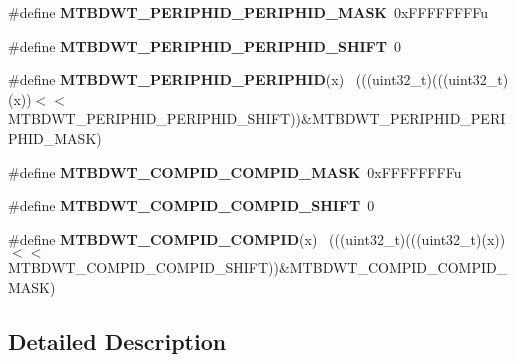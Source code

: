 \begin{DoxyCompactItemize}
\item 
\hypertarget{group___m_t_b_d_w_t___register___masks_gaa49f29267dcedd6db6aafce7b226182b}{}\#define {\bfseries M\+T\+B\+D\+W\+T\+\_\+\+P\+E\+R\+I\+P\+H\+I\+D\+\_\+\+P\+E\+R\+I\+P\+H\+I\+D\+\_\+\+M\+A\+S\+K}~0x\+F\+F\+F\+F\+F\+F\+F\+Fu\label{group___m_t_b_d_w_t___register___masks_gaa49f29267dcedd6db6aafce7b226182b}

\item 
\hypertarget{group___m_t_b_d_w_t___register___masks_gaa9dfe45d3ebe7c1496f24e1b898ae6a5}{}\#define {\bfseries M\+T\+B\+D\+W\+T\+\_\+\+P\+E\+R\+I\+P\+H\+I\+D\+\_\+\+P\+E\+R\+I\+P\+H\+I\+D\+\_\+\+S\+H\+I\+F\+T}~0\label{group___m_t_b_d_w_t___register___masks_gaa9dfe45d3ebe7c1496f24e1b898ae6a5}

\item 
\hypertarget{group___m_t_b_d_w_t___register___masks_ga0fcfc93024f0b323172a0245cfe76818}{}\#define {\bfseries M\+T\+B\+D\+W\+T\+\_\+\+P\+E\+R\+I\+P\+H\+I\+D\+\_\+\+P\+E\+R\+I\+P\+H\+I\+D}(x)                        ~(((uint32\+\_\+t)(((uint32\+\_\+t)(x))$<$$<$M\+T\+B\+D\+W\+T\+\_\+\+P\+E\+R\+I\+P\+H\+I\+D\+\_\+\+P\+E\+R\+I\+P\+H\+I\+D\+\_\+\+S\+H\+I\+F\+T))\&M\+T\+B\+D\+W\+T\+\_\+\+P\+E\+R\+I\+P\+H\+I\+D\+\_\+\+P\+E\+R\+I\+P\+H\+I\+D\+\_\+\+M\+A\+S\+K)\label{group___m_t_b_d_w_t___register___masks_ga0fcfc93024f0b323172a0245cfe76818}

\item 
\hypertarget{group___m_t_b_d_w_t___register___masks_ga6b80c05493bf46a1572b3f25fda4764b}{}\#define {\bfseries M\+T\+B\+D\+W\+T\+\_\+\+C\+O\+M\+P\+I\+D\+\_\+\+C\+O\+M\+P\+I\+D\+\_\+\+M\+A\+S\+K}~0x\+F\+F\+F\+F\+F\+F\+F\+Fu\label{group___m_t_b_d_w_t___register___masks_ga6b80c05493bf46a1572b3f25fda4764b}

\item 
\hypertarget{group___m_t_b_d_w_t___register___masks_ga26fe709d00d1433ca5a041dc307adfaa}{}\#define {\bfseries M\+T\+B\+D\+W\+T\+\_\+\+C\+O\+M\+P\+I\+D\+\_\+\+C\+O\+M\+P\+I\+D\+\_\+\+S\+H\+I\+F\+T}~0\label{group___m_t_b_d_w_t___register___masks_ga26fe709d00d1433ca5a041dc307adfaa}

\item 
\hypertarget{group___m_t_b_d_w_t___register___masks_ga08b9043ddbb7b805947ba6b5717fc54d}{}\#define {\bfseries M\+T\+B\+D\+W\+T\+\_\+\+C\+O\+M\+P\+I\+D\+\_\+\+C\+O\+M\+P\+I\+D}(x)                                ~(((uint32\+\_\+t)(((uint32\+\_\+t)(x))$<$$<$M\+T\+B\+D\+W\+T\+\_\+\+C\+O\+M\+P\+I\+D\+\_\+\+C\+O\+M\+P\+I\+D\+\_\+\+S\+H\+I\+F\+T))\&M\+T\+B\+D\+W\+T\+\_\+\+C\+O\+M\+P\+I\+D\+\_\+\+C\+O\+M\+P\+I\+D\+\_\+\+M\+A\+S\+K)\label{group___m_t_b_d_w_t___register___masks_ga08b9043ddbb7b805947ba6b5717fc54d}

\end{DoxyCompactItemize}


\subsection{Detailed Description}
